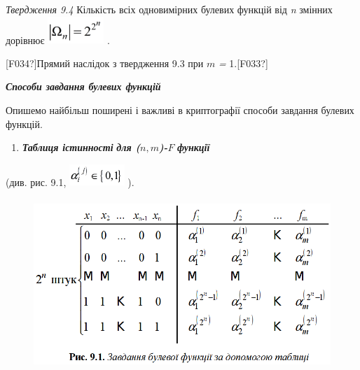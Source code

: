 \bigskip


\bigskip


\bigskip

\textit{Твердження 9.4}  Кількість  всіх одновимірних булевих функцій від
\textit{n }змінних дорівнює  
\includegraphics[width=0.8339in,height=0.4016in]{crypt-img/crypt-img99.png} .

\textlatin{[F034?]}Прямий наслідок з твердження 9.3 при  $m$\textit{ =
}1.\textlatin{[F033?]}


\bigskip


\bigskip

{\centering\bfseries\itshape
Способи завдання булевих функцій
\par}


\bigskip

Опишемо найбільш поширені і важливі в криптографії способи завдання булевих
функцій.


\bigskip

\liststyleWWviiiNumlii
\begin{enumerate}
\item \textbf{\textit{Таблиця істинності}} \textbf{\textit{для 
(}}\textbf{$n$}\textbf{$,$}\textbf{$m$}\textbf{\textit{)-}}\textbf{$F$}\textbf{\textit{
 функції}}
\end{enumerate}
 (див. рис. 9.1, 
\includegraphics[width=0.8189in,height=0.3189in]{crypt-img/crypt-img100.png} ).


\bigskip



\begin{figure}
\centering
\includegraphics[width=5.0043in,height=2.5457in]{crypt-img/crypt-img101.png}
\end{figure}

